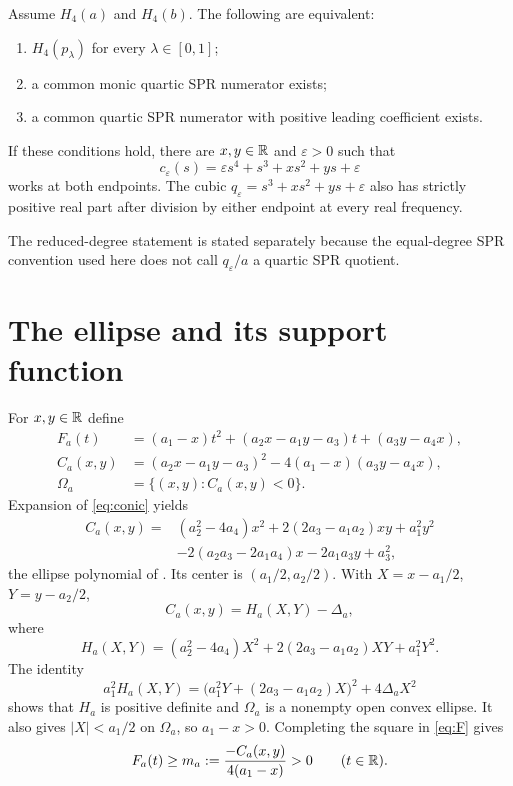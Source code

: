 \documentclass[11pt]{article}
\begin{document}
\begin{theorem}\label{thm:main}
Assume $H_4(a)$ and $H_4(b)$. The following are equivalent:
\begin{enumerate}
\item $H_4(p_\lambda)$ for every $\lambda\in[0,1]$;
\item a common monic quartic SPR numerator exists;
\item a common quartic SPR numerator with positive leading coefficient exists.
\end{enumerate}
If these conditions hold, there are $x,y\in\mathbb R$ and $\varepsilon>0$ such that
\begin{equation}\label{eq:c}
 c_\varepsilon(s)=\varepsilon s^4+s^3+xs^2+ys+\varepsilon
\end{equation}
works at both endpoints. The cubic $q_\varepsilon=s^3+xs^2+ys+\varepsilon$ also has strictly positive real part after division by either endpoint at every real frequency.
\end{theorem}
The reduced-degree statement is stated separately because the equal-degree SPR convention used here does not call $q_\varepsilon/a$ a quartic SPR quotient.

\section{The ellipse and its support function}
For $x,y\in\mathbb R$ define
\begin{align}
 F_a(t)&=(a_1-x)t^2+(a_2x-a_1y-a_3)t+(a_3y-a_4x),\label{eq:F}\\
 C_a(x,y)&=(a_2x-a_1y-a_3)^2-4(a_1-x)(a_3y-a_4x),\label{eq:conic}\\
 \Omega_a&=\{(x,y):C_a(x,y)<0\}.
\end{align}
Expansion of \eqref{eq:conic} yields
\begin{align*}
 C_a(x,y)={}&(a_2^2-4a_4)x^2+2(2a_3-a_1a_2)xy+a_1^2y^2\\
 &-2(a_2a_3-2a_1a_4)x-2a_1a_3y+a_3^2,
\end{align*}
the ellipse polynomial of \cite[Lemma~1]{yuWang2001Quartic}. Its center is $(a_1/2,a_2/2)$. With $X=x-a_1/2$, $Y=y-a_2/2$,
\[
 C_a(x,y)=H_a(X,Y)-\Delta_a,
\]
where
\[
 H_a(X,Y)=(a_2^2-4a_4)X^2+2(2a_3-a_1a_2)XY+a_1^2Y^2.
\]
The identity
\begin{equation}\label{eq:square}
 a_1^2H_a(X,Y)
 =\bigl(a_1^2Y+(2a_3-a_1a_2)X\bigr)^2+4\Delta_aX^2
\end{equation}
shows that $H_a$ is positive definite and $\Omega_a$ is a nonempty open convex ellipse. It also gives $|X|<a_1/2$ on $\Omega_a$, so $a_1-x>0$. Completing the square in \eqref{eq:F} gives
\begin{equation}\label{eq:margin}
 F_a(t)\ge m_a:=\frac{-C_a(x,y)}{4(a_1-x)}>0\qquad(t\in\mathbb R).
\end{equation}
\end{document}
